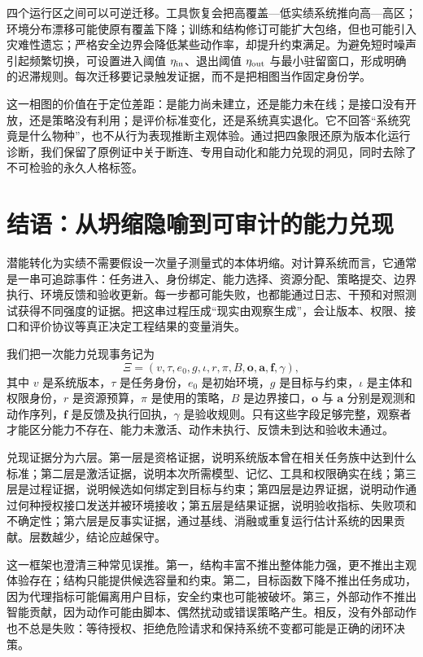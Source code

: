 四个运行区之间可以可逆迁移。工具恢复会把高覆盖—低实绩系统推向高—高区；环境分布漂移可能使原有覆盖下降；训练和结构修订可能扩大包络，但也可能引入灾难性遗忘；严格安全边界会降低某些动作率，却提升约束满足。为避免短时噪声引起频繁切换，可设置进入阈值 $\eta_{\rm in}$、退出阈值 $\eta_{\rm out}$ 与最小驻留窗口，形成明确的迟滞规则。每次迁移要记录触发证据，而不是把相图当作固定身份学。

这一相图的价值在于定位差距：是能力尚未建立，还是能力未在线；是接口没有开放，还是策略没有利用；是评价标准变化，还是系统真实退化。它不回答“系统究竟是什么物种”，也不从行为表现推断主观体验。通过把四象限还原为版本化运行诊断，我们保留了原例证中关于断连、专用自动化和能力兑现的洞见，同时去除了不可检验的永久人格标签。

\section{结语：从坍缩隐喻到可审计的能力兑现}
\label{sec:section_1526}
潜能转化为实绩不需要假设一次量子测量式的本体坍缩。对计算系统而言，它通常是一串可追踪事件：任务进入、身份绑定、能力选择、资源分配、策略提交、边界执行、环境反馈和验收更新。每一步都可能失败，也都能通过日志、干预和对照测试获得不同强度的证据。把这串过程压成“现实由观察生成”，会让版本、权限、接口和评价协议等真正决定工程结果的变量消失。

我们把一次能力兑现事务记为
\[
\Xi=
(v,\tau,e_0,g,\iota,r,\pi,B,\mathbf o,\mathbf a,\mathbf f,\gamma),
\]
其中 $v$ 是系统版本，$\tau$ 是任务身份，$e_0$ 是初始环境，$g$ 是目标与约束，$\iota$ 是主体和权限身份，$r$ 是资源预算，$\pi$ 是使用的策略，$B$ 是边界接口，$\mathbf o$ 与 $\mathbf a$ 分别是观测和动作序列，$\mathbf f$ 是反馈及执行回执，$\gamma$ 是验收规则。只有这些字段足够完整，观察者才能区分能力不存在、能力未激活、动作未执行、反馈未到达和验收未通过。

兑现证据分为六层。第一层是资格证据，说明系统版本曾在相关任务族中达到什么标准；第二层是激活证据，说明本次所需模型、记忆、工具和权限确实在线；第三层是过程证据，说明候选如何绑定到目标与约束；第四层是边界证据，说明动作通过何种授权接口发送并被环境接收；第五层是结果证据，说明验收指标、失败项和不确定性；第六层是反事实证据，通过基线、消融或重复运行估计系统的因果贡献。层数越少，结论应越保守。

这一框架也澄清三种常见误推。第一，结构丰富不推出整体能力强，更不推出主观体验存在；结构只能提供候选容量和约束。第二，目标函数下降不推出任务成功，因为代理指标可能偏离用户目标，安全约束也可能被破坏。第三，外部动作不推出智能贡献，因为动作可能由脚本、偶然扰动或错误策略产生。相反，没有外部动作也不总是失败：等待授权、拒绝危险请求和保持系统不变都可能是正确的闭环决策。

